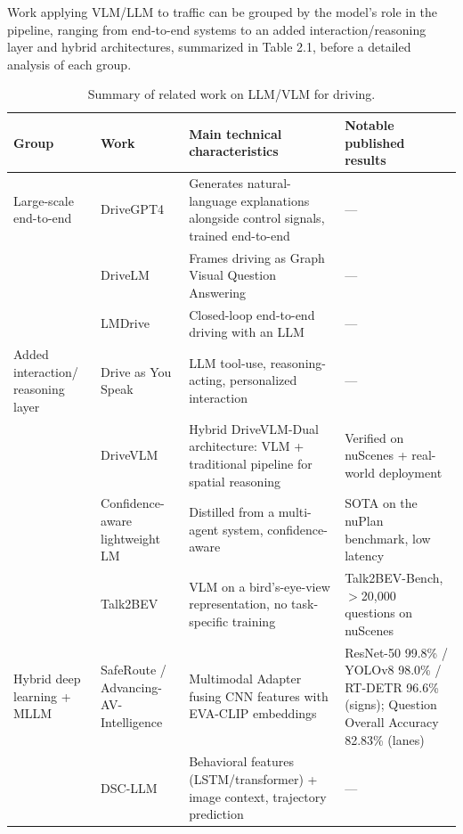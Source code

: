 \documentclass[12pt,a4paper]{report}
\begin{document}
Work applying VLM/LLM to traffic can be grouped by the model's role in the pipeline, ranging from end-to-end systems to an added interaction/reasoning layer and hybrid architectures, summarized in Table 2.1, before a detailed analysis of each group.

\begin{table}[htbp]
    \centering
    \footnotesize
    \caption{Summary of related work on LLM/VLM for driving.}
    \label{tab:2.1}
    \begin{tabularx}{\linewidth}{@{}p{2.6cm}p{2.4cm}Xp{3.6cm}@{}}
        \toprule
        \textbf{Group} & \textbf{Work} & \textbf{Main technical characteristics} & \textbf{Notable published results} \\
        \midrule
        Large-scale end-to-end & DriveGPT4 \cite{xu2024drivegpt4} & Generates natural-language explanations alongside control signals, trained end-to-end & --- \\
         & DriveLM \cite{sima2024drivelm} & Frames driving as Graph Visual Question Answering & --- \\
         & LMDrive \cite{shao2024lmdrive} & Closed-loop end-to-end driving with an LLM & --- \\
        Added interaction/ reasoning layer & Drive as You Speak \cite{cui2024driveasyouspeak} & LLM tool-use, reasoning-acting, personalized interaction & --- \\
         & DriveVLM \cite{tian2024drivevlm} & Hybrid DriveVLM-Dual architecture: VLM + traditional pipeline for spatial reasoning & Verified on nuScenes + real-world deployment \\
         & Confidence-aware lightweight LM \cite{yao2026confidenceaware} & Distilled from a multi-agent system, confidence-aware & SOTA on the nuPlan benchmark, low latency \\
         & Talk2BEV \cite{choudhary2024talk2bev} & VLM on a bird's-eye-view representation, no task-specific training & Talk2BEV-Bench, $>$20{,}000 questions on nuScenes \\
        Hybrid deep learning + MLLM & SafeRoute \cite{shaw2025saferoute} / Advancing-AV-Intelligence \cite{sah2025advancing} & Multimodal Adapter fusing CNN features with EVA-CLIP embeddings & ResNet-50 99.8\% / YOLOv8 98.0\% / RT-DETR 96.6\% (signs); Question Overall Accuracy 82.83\% (lanes) \\
         & DSC-LLM \cite{kim2025dscllm} & Behavioral features (LSTM/transformer) + image context, trajectory prediction & --- \\
        \bottomrule
    \end{tabularx}
\end{table}
\end{document}
